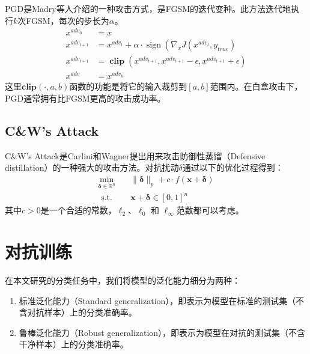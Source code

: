 PGD是Madry等人介绍的一种攻击方式，是FGSM的迭代变种。此方法迭代地执行$k$次FGSM，每次的步长为$\alpha$。
\begin{equation}
    \begin{aligned}
        x^{a d v_{0}} & =x \\
        x^{a d v_{t+1}} & =x^{a d v_{t}}+\alpha \cdot \operatorname{sign}\left(\nabla_{x} J\left(x^{a d v_{t}}, y_{t r u e}\right)\right. \\
        x^{a d v_{t+1}} & =\operatorname{\textbf{clip}}\left(x^{a d v_{t+1}}, x^{a d v_{t+1}}-\epsilon, x^{a d v_{t+1}}+\epsilon\right) \\ 
        x^{a d v} & =x^{a d v_{k}}
    \end{aligned}
\end{equation}
这里$\textbf{clip}(\cdot, a, b)$函数的功能是将它的输入裁剪到$[a, b]$范围内。在白盒攻击下，PGD通常拥有比FGSM更高的攻击成功率。

\subsection{C\&W's Attack}

C\&W's Attack是Carlini和Wagner提出用来攻击防御性蒸馏（Defensive distillation）\cite{papernot2016distillation}的一种强大的攻击方法。对抗扰动$\delta$通过以下的优化过程得到：
\begin{equation}
    \begin{aligned}
        {\min_{\boldsymbol{\delta} \in \mathbb{R}^{n}}} \quad & {\|\boldsymbol{\delta}\|_{p}+c \cdot f(\mathbf{x}+\boldsymbol{\delta})} \\
        {\text { s.t. }} \quad & {\mathbf{x}+\boldsymbol{\delta} \in[0,1]^{n}}
    \end{aligned}
\end{equation}
其中$c>0$是一个合适的常数，$\ell_{2}$、$\ell_{0}$ 和 $\ell_{\infty}$范数都可以考虑。

\section{对抗训练}

在本文研究的分类任务中，我们将模型的泛化能力细分为两种：
\begin{enumerate}
    \item 标准泛化能力（Standard generalization），即表示为模型在标准的测试集（不含对抗样本）上的分类准确率。
    \item 鲁棒泛化能力（Robust generalization），即表示为模型在对抗的测试集（不含干净样本）上的分类准确率。
\end{enumerate}

